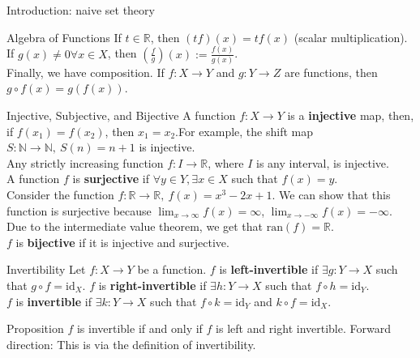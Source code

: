 \documentclass[8pt]{extarticle}
\begin{document}
\begin{problem}{Introduction: naive set theory}
\begin{problem}{Algebra of Functions}
      If $t\in \mathbb{R}$, then $(tf)(x) = tf(x)$ (scalar multiplication). If $g(x)\neq 0\forall x\in X$, then $\left(\frac{f}{g}\right)(x) := \frac{f(x)}{g(x)}$.\\

      Finally, we have composition. If $f:X\rightarrow Y$ and $g:Y\rightarrow Z$ are functions, then $g\circ f(x) = g(f(x))$.
    \end{problem}
    \begin{problem}{Injective, Subjective, and Bijective}
      A function $f:X\rightarrow Y$ is a \textbf{injective} map, then, if $f(x_1) = f(x_2)$, then $x_1 = x_2$.For example, the shift map $S:\mathbb{N} \rightarrow \mathbb{N},~S(n) = n+1$ is injective.\\

      Any strictly increasing function $f:I\rightarrow \mathbb{R}$, where $I$ is any interval, is injective.\\

      A function $f$ is \textbf{surjective} if $\forall y\in Y, \exists x\in X$ such that $f(x) = y$.\\

      Consider the function $f:\mathbb{R} \rightarrow \mathbb{R},~f(x) = x^3-2x+1$. We can show that this function is surjective because $\lim_{x\rightarrow \infty}f(x) = \infty$, $\lim_{x\rightarrow -\infty} f(x) = -\infty$. Due to the intermediate value theorem, we get that $\textrm{ran}(f) = \mathbb{R}$.\\

      $f$ is \textbf{bijective} if it is injective and surjective.
    \end{problem}
    \begin{problem}{Invertibility}
      Let $f:X\rightarrow Y$ be a function. $f$ is \textbf{left-invertible} if $\exists g:Y\rightarrow X$ such that $g\circ f = \textrm{id}_X$. $f$ is \textbf{right-invertible} if $\exists h:Y\rightarrow X$ such that $f\circ h = \textrm{id}_Y$.\\

      $f$ is \textbf{invertible} if $\exists k:Y\rightarrow X$ such that $f\circ k = \textrm{id}_Y$ and $k\circ f = \textrm{id}_X$.\\

      \begin{problem}{Proposition}
        $f$ is invertible if and only if $f$ is left and right invertible.
        \tcblower
          Forward direction: This is via the definition of invertibility.\\


\end{problem}
\end{problem}
\end{problem}
\end{document}
